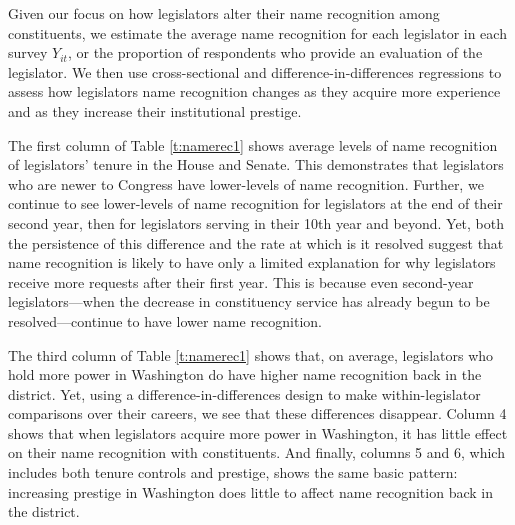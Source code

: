 \documentclass{article}
\begin{document}
Given our focus on how legislators alter their name recognition among constituents, we estimate the average name recognition for each legislator in each survey $Y_{it}$, or the proportion of respondents who provide an evaluation of the legislator.  We then use cross-sectional and difference-in-differences regressions to assess how legislators name recognition changes as they acquire more experience and as they increase their institutional prestige.  

\begin{table}[hbt!]
\caption{Limited Changes in Name Recognition} \label{t:namerec1}

\begin{minipage}{\textwidth}
\begin{center}

\end{center}
\end{minipage}
\end{table}


The first column of Table \ref{t:namerec1} shows average levels of name recognition of legislators' tenure in the House and Senate.  This demonstrates that legislators who are newer to Congress have lower-levels of name recognition. Further, we continue to see lower-levels of name recognition for legislators at the end of their second year, then for legislators serving in their 10th year and beyond.  Yet, both the persistence of this difference and the rate at which is it resolved suggest that name recognition is likely to have only a limited explanation for why legislators receive more requests after their first year.  This is because even second-year legislators---when the decrease in constituency service has already begun to be resolved---continue to have lower name recognition.   


The third column of Table \ref{t:namerec1} shows that, on average, legislators who hold more power in Washington do have higher name recognition back in the district.  Yet, using a difference-in-differences design to make within-legislator comparisons over their careers, we see that these differences disappear.  Column 4 shows that when legislators acquire more power in Washington, it has little effect on their name recognition with constituents.  And finally, columns 5 and 6, which includes both tenure controls and prestige, shows the same basic pattern: increasing prestige in Washington does little to affect name recognition back in the district.  
\end{document}
